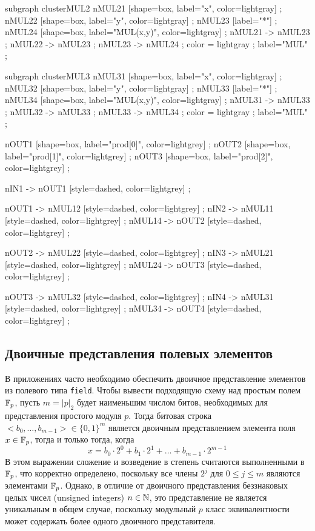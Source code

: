 \begin{example}
\begin{center}
{    subgraph clusterMUL2 {
    nMUL21 [shape=box, label="x", color=lightgray] ;
    nMUL22 [shape=box, label="y", color=lightgray] ;
    nMUL23 [label="*"] ;
    nMUL24 [shape=box, label="MUL(x,y)", color=lightgray] ;
    nMUL21 -> nMUL23 ;
    nMUL22 -> nMUL23 ;
    nMUL23 -> nMUL24 ;
    color = lightgray ;
    label="MUL" ;
  }
  
    subgraph clusterMUL3 {
    nMUL31 [shape=box, label="x", color=lightgray] ;
    nMUL32 [shape=box, label="y", color=lightgray] ;
    nMUL33 [label="*"] ;
    nMUL34 [shape=box, label="MUL(x,y)", color=lightgray] ;
    nMUL31 -> nMUL33 ;
    nMUL32 -> nMUL33 ;
    nMUL33 -> nMUL34 ;
    color = lightgray ;
    label="MUL" ;
  }

  nOUT1 [shape=box, label="prod[0]", color=lightgrey] ;
  nOUT2 [shape=box, label="prod[1]", color=lightgrey] ;
  nOUT3 [shape=box, label="prod[2]", color=lightgrey] ;
  
  nIN1 -> nOUT1 [style=dashed, color=lightgrey] ;
  
  nOUT1 -> nMUL12 [style=dashed, color=lightgrey] ;
  nIN2 -> nMUL11 [style=dashed, color=lightgrey] ;
  nMUL14 -> nOUT2 [style=dashed, color=lightgrey] ;
 
  nOUT2 -> nMUL22 [style=dashed, color=lightgrey] ;
  nIN3 -> nMUL21 [style=dashed, color=lightgrey] ;
  nMUL24 -> nOUT3 [style=dashed, color=lightgrey] ; 
  
  nOUT3 -> nMUL32 [style=dashed, color=lightgrey] ;
  nIN4 -> nMUL31 [style=dashed, color=lightgrey] ;
  nMUL34 -> nOUT4 [style=dashed, color=lightgrey] ;  
  
}
\end{center}
\end{example}
\subsection{Двоичные представления полевых элементов} В приложениях часто необходимо обеспечить двоичное представление элементов из полевого типа \texttt{field}. Чтобы вывести подходящую схему над простым полем $\mathbb{F}_p$, пусть $m=|p|_2$ будет наименьшим числом битов, необходимых для представления простого модуля $p$. Тогда битовая строка $<b_0,\ldots,b_{m-1}>\in \{0,1\}^m$ является двоичным представлением элемента поля $x\in\mathbb{F}_p$, тогда и только тогда, когда
\begin{equation}
\label{def:binary_field_rep}
x = b_0\cdot 2^0 + b_1\cdot 2^1 + \ldots + b_{m-1}\cdot 2^{m-1}
\end{equation}
В этом выражении сложение и возведение в степень считаются выполненными в $\mathbb{F}_p$, что корректно определено, поскольку все члены $2^j$ для $0 \leq j \leq m$ являются элементами $\mathbb{F}_p$. Однако, в отличие от двоичного представления беззнаковых целых чисел (unsigned integers) $n\in\mathbb{N}$, это представление не является уникальным в общем случае, поскольку модульный $p$ класс эквивалентности может содержать более одного двоичного представителя.


